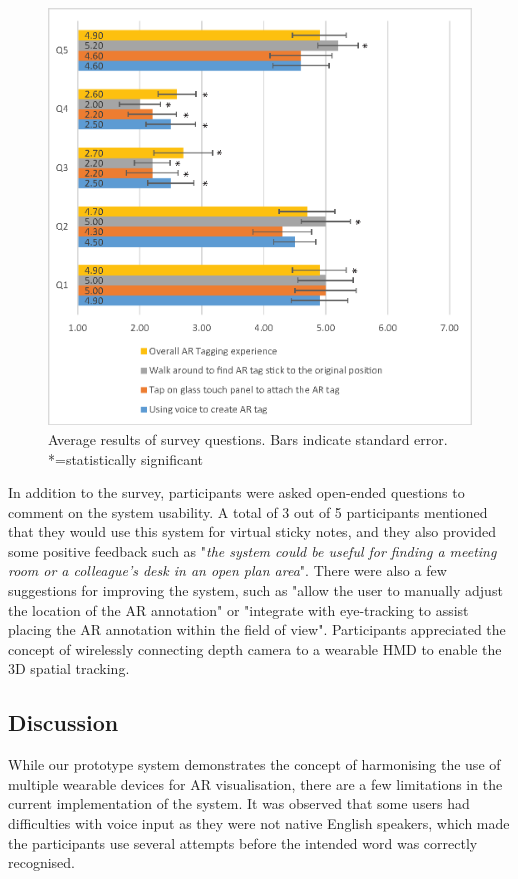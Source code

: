 \begin{figure}
  \centering
  \includegraphics[width=.8\linewidth]{images/62-3d-mgia15/user_study_results2.eps}
  \caption{Average results of survey questions. Bars indicate standard error. *=statistically significant}
    \label{survey_results}
\end{figure}

In addition to the survey, participants were asked open-ended questions to comment on the system usability. A total of 3 out of 5 participants mentioned that they would use this system for virtual sticky notes, and they also provided some positive feedback such as "\textit{the system could be useful for finding a meeting room or a colleague's desk in an open plan area}". There were also a few suggestions for improving the system, such as "allow the user to manually adjust the location of the AR annotation" or "integrate with eye-tracking to assist placing the AR annotation within the field of view". Participants appreciated the concept of wirelessly connecting depth camera to a wearable HMD to enable the 3D spatial tracking.    

\subsection{Discussion}

While our prototype system demonstrates the concept of harmonising the use of multiple wearable devices for AR visualisation, there are a few limitations in the current implementation of the system. It was observed that some users had difficulties with voice input as they were not native English speakers, which made the participants use several attempts before the intended word was correctly recognised.  

